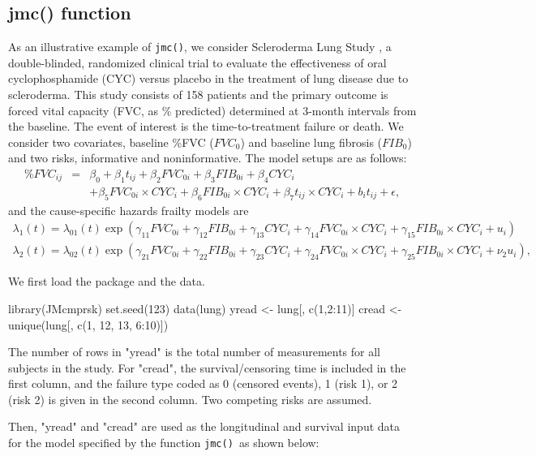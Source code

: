 \subsection{jmc() function}
As an illustrative example of \texttt{jmc()}, we consider Scleroderma Lung Study \citep{tashkin2006cyclophosphamide}, a double-blinded, randomized clinical trial to evaluate the effectiveness of oral cyclophosphamide (CYC) versus placebo in the treatment of lung disease due to scleroderma. This study consists of 158 patients and the primary outcome is forced vital capacity (FVC, as \% predicted) determined at 3-month intervals from the baseline. The event of interest is the time-to-treatment failure or death. We consider two covariates, baseline \%FVC ($FVC_0$) and baseline lung fibrosis ($FIB_0$) and two risks, informative and noninformative. The model setups are as follows:
\begin{eqnarray*}
\%FVC_{ij}&=&\beta_0+\beta_1t_{ij}+\beta_2FVC_{0i}+\beta_3FIB_{0i}+\beta_4CYC_i\\
&&+\beta_5FVC_{0i}\times CYC_i+\beta_6FIB_{0i}\times CYC_i+\beta_7 t_{ij}\times CYC_i+b_it_{ij}+\epsilon,
\end{eqnarray*}
and the cause-specific hazards frailty models are
\begin{eqnarray*}
\lambda_1(t)=\lambda_{01}(t)\exp(\gamma_{11}FVC_{0i}+\gamma_{12}FIB_{0i}+\gamma_{13}CYC_i+\gamma_{14}FVC_{0i}\times CYC_i+\gamma_{15}FIB_{0i}\times CYC_i+u_i)\\
\lambda_2(t)=\lambda_{02}(t)\exp(\gamma_{21}FVC_{0i}+\gamma_{22}FIB_{0i}+\gamma_{23}CYC_i+\gamma_{24}FVC_{0i}\times CYC_i+\gamma_{25}FIB_{0i}\times CYC_i+\nu_2u_i),
\end{eqnarray*}


We first load the package and the data.
\begin{example}
library(JMcmprsk)
set.seed(123)
data(lung)
yread <- lung[, c(1,2:11)]
cread <- unique(lung[, c(1, 12, 13, 6:10)])
\end{example}
The number of rows in "yread" is the total number of measurements for all subjects in the study. For "cread", the survival/censoring time is included in the first column, and the failure type coded as 0 (censored events), 1 (risk 1), or 2 (risk 2) is given in the second column. Two competing risks are assumed.

Then, "yread" and "cread" are used as the longitudinal and survival input data for the model specified by the function \texttt{jmc() }as shown below:

